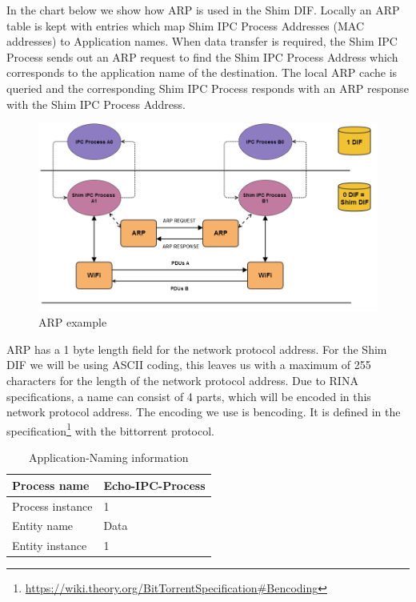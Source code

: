 \npar

In the chart below we show how ARP is used in the Shim DIF. Locally an ARP table is kept with entries which map Shim IPC Process Addresses (MAC addresses) to Application names. When data transfer is required, the Shim IPC Process sends out an ARP request to find the Shim IPC Process Address which corresponds to the application name of the destination. The local ARP cache is queried and the corresponding Shim IPC Process responds with an ARP response with the Shim IPC Process Address.

\npar

\begin{figure}[H]
    \centering
    \includegraphics[width=1\textwidth]{figures/arp_example}
    \caption{ARP example} 
    \label{fig:arp_example}
\end{figure}

\npar

ARP has a 1 byte length field for the network protocol address. For the Shim DIF we will be using ASCII coding, this leaves us with a maximum of 255 characters for the length of the network protocol address. Due to RINA specifications, a name can consist of 4 parts, which will be encoded in this network protocol address. The encoding we use is bencoding. It is defined in the specification\footnote{\url{https://wiki.theory.org/BitTorrentSpecification\#Bencoding}} with the bittorrent protocol.

\npar

\begin{table}[H]
	\begin{center}
		\begin{tabular}{|l|l|}
			\hline
				Process name & Echo-IPC-Process  \\ \hline
				Process instance & 1 \\ \hline
				Entity name & Data \\ \hline
				Entity instance & 1 \\ \hline
		\end{tabular}
		\caption{Application-Naming information}
	\end{center}
\end{table}

